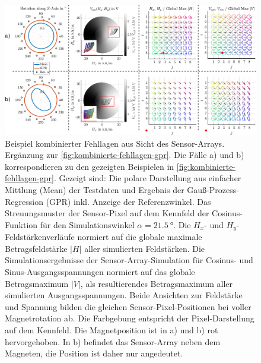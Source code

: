 \clearpage
\begin{landscape}
\begin{figure}[tbph]
	\centering
	\includegraphics[width=.85\linewidth]{chapters/images/4-EuOExp/Kombinierte-Fehllagen-Sensor}
	\caption[Beispiel kombinierter Fehllagen aus Sicht des Sensor-Arrays]{Beispiel kombinierter Fehllagen aus Sicht des Sensor-Arrays. Ergänzung zur \autoref{fig:kombinierte-fehllagen-gpr}. Die Fälle a) und b) korrespondieren zu den gezeigten Beispielen in \autoref{fig:kombinierte-fehllagen-gpr}. Gezeigt sind: Die polare Darstellung aus einfacher Mittlung (Mean) der Testdaten und Ergebnis der Gauß-Prozess-Regression (GPR) inkl. Anzeige der Referenzwinkel. Das Streuungsmuster der Sensor-Pixel auf dem Kennfeld der Cosinus-Funktion für den Simulationswinkel $\alpha = \SI{21,5}{\degree}$. Die $H_x$- und $H_y$-Feldstärkenverläufe normiert auf die globale maximale Betragsfeldstärke $|H|$ aller simulierten Feldstärken. Die Simulationsergebnisse der Sensor-Array-Simulation für Cosinus- und Sinus-Ausgangsspannungen normiert auf das globale Betragsmaximum $|V|$, als resultierendes Betragsmaximum aller simulierten Ausgangsspannungen. Beide Ansichten zur Feldstärke und Spannung bilden die gleichen Sensor-Pixel-Positionen  bei voller Magnetrotation ab. Die Farbgebung entspricht der Pixel-Darstellung auf dem Kennfeld. Die Magnetposition ist in a) und b) rot hervorgehoben. In b) befindet das Sensor-Array neben dem Magneten, die Position ist daher nur angedeutet.}
	\label{fig:kombinierte-fehllagen-sensor}
\end{figure}	
\end{landscape}


\clearpage

